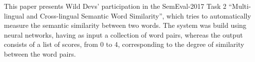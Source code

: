 This paper presents Wild Devs' participation in the SemEval-2017 Task 2 ``Multi-lingual and Cross-lingual Semantic Word Similarity'', which tries to automatically measure the semantic similarity between two words. The system was build using neural networks, having as input a collection of word pairs, whereas the output consists of a list of scores, from 0 to 4, corresponding to the degree of similarity between the word pairs.
